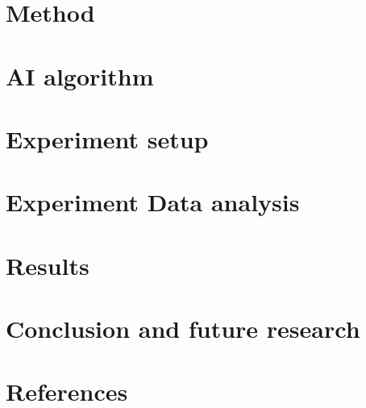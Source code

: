 \documentclass[5p]{elsarticle}
\begin{document}
\section{Method}
\label{sec:orgc07c5fa}
\section{AI algorithm}
\label{sec:org889ba8c}
\section{Experiment setup}
\label{sec:orgdaec478}
\section{Experiment Data analysis}
\label{sec:orgc472790}
\section{Results}
\label{sec:org567d660}
\section{Conclusion and future research}
\label{sec:org70e9a27}
\section{References}
\label{sec:orgd627c5d}




\end{document}
